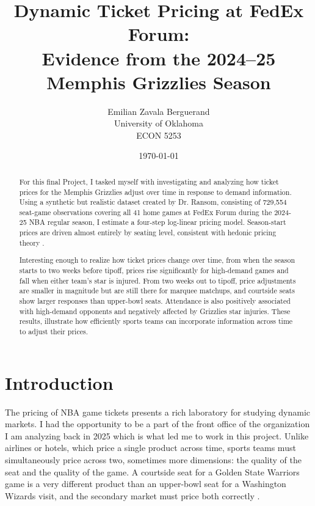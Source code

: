 \documentclass[12pt]{article}
\title{\textbf{Dynamic Ticket Pricing at FedEx Forum:}\\
       Evidence from the 2024--25 Memphis Grizzlies Season}
\author{Emilian Zavala Berguerand\\
        \small University of Oklahoma\\
        \small ECON 5253}
\date{\today}
\begin{document}
\maketitle
 
\begin{abstract}
\noindent
For this final Project, I tasked myself with investigating and analyzing how ticket prices for the Memphis Grizzlies adjust over time in response to demand information. Using a synthetic but realistic dataset created by Dr. Ransom, consisting of 729,554 seat-game observations covering all 41 home games at FedEx Forum during the 2024-25 NBA regular season, I estimate a four-step log-linear pricing model. Season-start prices are driven almost entirely by seating level, consistent with hedonic pricing theory \citep{rosen1974hedonic}.

Interesting enough to realize how ticket prices change over time, from when the season starts to two weeks before tipoff, prices rise significantly for high-demand games and fall when either team’s star is injured. From two weeks out to tipoff, price adjustments are smaller in magnitude but are still there for marquee matchups, and courtside seats show larger responses than upper-bowl seats. Attendance is also positively associated with high-demand opponents and negatively affected by Grizzlies star injuries. These results, illustrate how efficiently sports teams can incorporate information across time to adjust their prices.
\end{abstract}
 
\newpage
\tableofcontents
\newpage
 
\section{Introduction}
 
The pricing of NBA game tickets presents a rich laboratory for studying dynamic markets. I had the opportunity to be a part of the front office of the organization I am analyzing back in 2025 which is what led me to work in this project. Unlike airlines or hotels, which price a single product across time, sports teams must simultaneously price across two, sometimes more dimensions: the quality of the seat and the quality of the game. A courtside seat for a Golden State Warriors game is a very different product than an upper-bowl seat for a Washington Wizards visit, and the secondary market must price both correctly \citep{drayer2012dynamic}.
 
\end{document}
